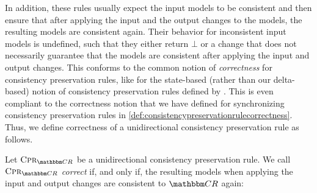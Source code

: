 In addition, these rules usually expect the input models to be consistent and then ensure that after applying the input and the output changes to the models, the resulting models are consistent again.
Their behavior for inconsistent input models is undefined, such that they either return $\bot$ or a change that does not necessarily guarantee that the models are consistent after applying the input and output changes.
This conforms to the common notion of \emph{correctness} for consistency preservation rules, like for the state-based (rather than our delta-based) notion of consistency preservation rules defined by \textcite{stevens2010sosym}.
This is even compliant to the correctness notion that we have defined for synchronizing consistency preservation rules in \autoref{def:consistencypreservationrulecorrectness}.
Thus, we define correctness of a unidirectional consistency preservation rule as follows.

\begin{definition}
    \label{def:unidirectionalconsistencypreservationrulecorrectness}
    Let $\consistencypreservationrule{\consistencyrelationset{CR}}$ be a unidirectional consistency preservation rule.
    We call $\consistencypreservationrule{\consistencyrelationset{CR}}$ \emph{correct} if, and only if, the resulting models when applying the input and output changes are consistent to $\consistencyrelationset{CR}$ again:
    \ifisafour\else\vspace{-0.3em}\fi
\end{definition}

